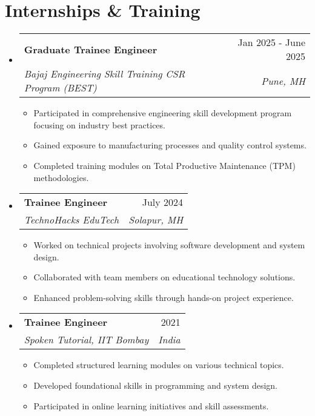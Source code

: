 \documentclass[letterpaper,11pt]{article}
\makeatletter
\newcommand{\resumeItem}[1]{
  \item\small{
    {#1 \vspace{2pt}}
  }
}
\newcommand{\resumeSubheading}[4]{
  \vspace{1pt}\item
    \begin{tabular*}{0.97\textwidth}[t]{l@{\extracolsep{\fill}}r}
      \textbf{#1} & #2 \\
      \textit{\large#3} & \textit{\large #4} \\
    \end{tabular*}\vspace{-7pt}
}
\newcommand{\resumeSubHeadingListStart}{\begin{itemize}[leftmargin=0.15in, label={}]}
\newcommand{\resumeSubHeadingListEnd}{\end{itemize}}
\newcommand{\resumeItemListStart}{\begin{itemize}}
\newcommand{\resumeItemListEnd}{\end{itemize}\vspace{-2pt}}
\makeatother
\begin{document}
\section{Internships \& Training}
  \resumeSubHeadingListStart

    \resumeSubheading
      {Graduate Trainee Engineer}{Jan 2025 - June 2025}
      {Bajaj Engineering Skill Training CSR Program (BEST)}{Pune, MH}
      \resumeItemListStart
        \resumeItem{Participated in comprehensive engineering skill development program focusing on industry best practices.}
        \resumeItem{Gained exposure to manufacturing processes and quality control systems.}
        \resumeItem{Completed training modules on Total Productive Maintenance (TPM) methodologies.}
      \resumeItemListEnd
    
    \resumeSubheading
      {Trainee Engineer}{July 2024}
      {TechnoHacks EduTech}{Solapur, MH}
      \resumeItemListStart
        \resumeItem{Worked on technical projects involving software development and system design.}
        \resumeItem{Collaborated with team members on educational technology solutions.}
        \resumeItem{Enhanced problem-solving skills through hands-on project experience.}
      \resumeItemListEnd

    \resumeSubheading
      {Trainee Engineer}{2021}
      {Spoken Tutorial, IIT Bombay}{India}
      \resumeItemListStart
        \resumeItem{Completed structured learning modules on various technical topics.}
        \resumeItem{Developed foundational skills in programming and system design.}
        \resumeItem{Participated in online learning initiatives and skill assessments.}
      \resumeItemListEnd

  \resumeSubHeadingListEnd


\end{document}
